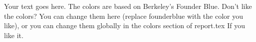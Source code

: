 \begin{tcolorbox}[breakable,title={An example colorbox},
colback=founderblue!5!white,
colframe=founderblue!75!black,
fonttitle=\headingfont\bfseries\large]
Your text goes here. The colors are based on Berkeley's Founder Blue.
Don't like the colors? You can change them here (replace founderblue with the color you like), or you can change them globally in the colors section of report.tex
If you like it.
\end{tcolorbox}






